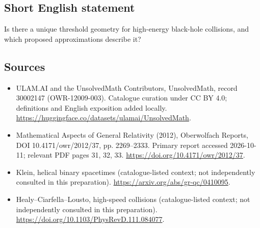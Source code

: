 \documentclass[11pt]{article}
\begin{document}
\subsection{Short English statement}
Is there a unique threshold geometry for high-energy black-hole collisions, and which proposed approximations describe it?
\subsection{Sources}
\begin{itemize}
\item[\hypertarget{source:30002147:1}{S1}] ULAM.AI and the UnsolvedMath Contributors, UnsolvedMath, record 30002147 (OWR-12009-003). Catalogue curation under CC BY 4.0; definitions and English exposition added locally.
\url{https://huggingface.co/datasets/ulamai/UnsolvedMath}.
\item[\hypertarget{source:30002147:2}{S2}] Mathematical Aspects of General Relativity (2012), Oberwolfach Reports, DOI 10.4171/owr/2012/37, pp. 2269--2333. Primary report accessed 2026-10-11; relevant PDF pages 31, 32, 33.
\url{https://doi.org/10.4171/owr/2012/37}.
\item[\hypertarget{source:30002147:3}{S3}] Klein, helical binary spacetimes (catalogue-listed context; not independently consulted in this preparation).
\url{https://arxiv.org/abs/gr-qc/0410095}.
\item[\hypertarget{source:30002147:4}{S4}] Healy--Ciarfella--Lousto, high-speed collisions (catalogue-listed context; not independently consulted in this preparation).
\url{https://doi.org/10.1103/PhysRevD.111.084077}.
\end{itemize}
\label{end:30002147}
\end{document}
